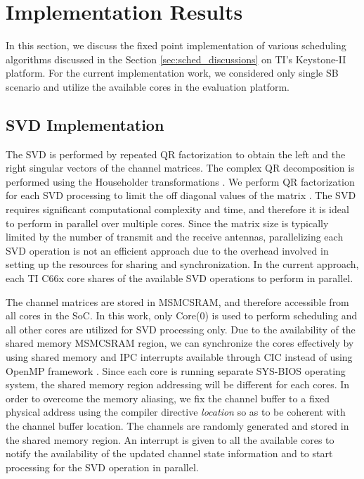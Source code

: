 \documentclass[conference,letterpaper]{./../../IEEE/IEEEtran}
\begin{document}
\section{Implementation Results}
\label{sec:implementation}
In this section, we discuss the fixed point implementation of various scheduling algorithms discussed in the Section \ref{sec:sched_discussions} on TI's Keystone-II platform. For the current implementation work, we considered only single SB scenario and utilize the available  cores in the evaluation platform. 

\subsection{SVD Implementation}
The SVD is performed by repeated QR factorization to obtain the left and the right singular vectors of the channel matrices. The complex QR decomposition is performed using the Householder transformations \cite{aft}. We perform  QR factorization for each SVD processing to limit the off diagonal values of the  matrix . The SVD requires significant computational complexity and time, and therefore it is ideal to perform in parallel over multiple cores. Since the matrix size is typically limited by the number of transmit and the receive antennas, parallelizing each SVD operation is not an efficient approach due to the overhead involved in setting up the resources for sharing and synchronization. In the current approach, each TI C66x core shares  of the available SVD operations to perform in parallel.
	
The channel matrices are stored in \ac{MSMCSRAM}, and therefore accessible from all cores in the \ac{SoC}. In this work, only Core(0) is used to perform scheduling and all other cores are utilized for SVD processing only. Due to the availability of the shared memory \ac{MSMCSRAM} region, we can synchronize the cores effectively by using shared memory and \ac{IPC} interrupts available through \ac{CIC} instead of using OpenMP framework \cite{openmp,ipc,cic}. Since each core is running separate SYS-BIOS operating system, the shared memory region addressing will be different for each cores. In order to overcome the memory aliasing, we fix the channel buffer to a fixed physical address using the compiler directive \textit{location} so as to be coherent with the channel buffer location. The channels are randomly generated and stored in the shared memory region. An interrupt is given to all the available cores to notify the availability of the updated channel state information and to start processing for the SVD operation in parallel.
\end{document}
